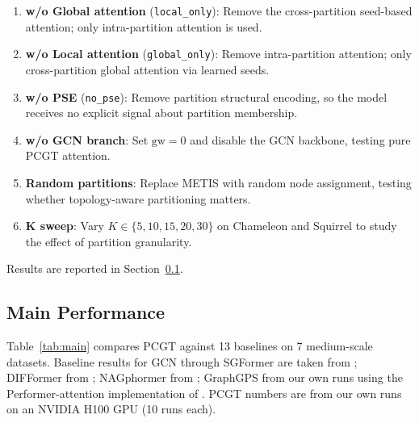 \documentclass[sigconf]{acmart}
\begin{document}
\begin{enumerate}
    \item \textbf{w/o Global attention} (\texttt{local\_only}): Remove the cross-partition seed-based attention; only intra-partition attention is used.
    \item \textbf{w/o Local attention} (\texttt{global\_only}): Remove intra-partition attention; only cross-partition global attention via learned seeds.
    \item \textbf{w/o PSE} (\texttt{no\_pse}): Remove partition structural encoding, so the model receives no explicit signal about partition membership.
    \item \textbf{w/o GCN branch}: Set $\text{gw}=0$ and disable the GCN backbone, testing pure PCGT attention.
    \item \textbf{Random partitions}: Replace METIS with random node assignment, testing whether topology-aware partitioning matters.
    \item \textbf{K sweep}: Vary $K \in \{5, 10, 15, 20, 30\}$ on Chameleon and Squirrel to study the effect of partition granularity.
\end{enumerate}

\noindent Results are reported in Section~\ref{sec:results}.


\subsection{Main Performance}
\label{sec:results}

Table~\ref{tab:main} compares PCGT against 13 baselines on 7 medium-scale datasets. Baseline results for GCN through SGFormer are taken from \citet{wu2023sgformer}; DIFFormer from \citet{wu2023difformer}; NAGphormer from \citet{chen2023nagphormer}; GraphGPS from our own runs using the Performer-attention implementation of \citet{rampasek2022graphgps}. PCGT numbers are from our own runs on an NVIDIA H100 GPU (10 runs each).
\end{document}
